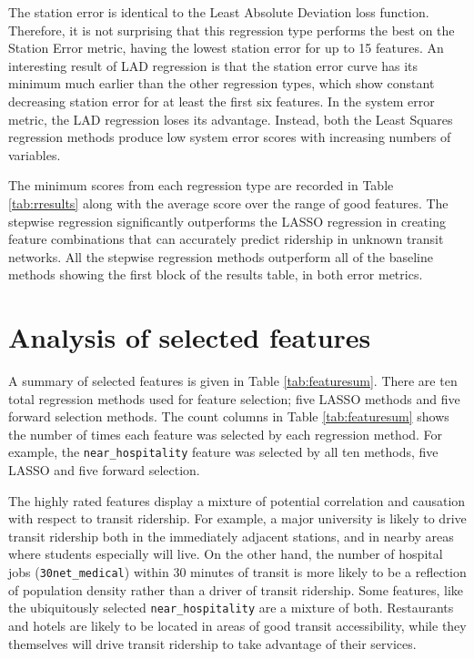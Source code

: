 \documentclass[11pt]{report}
\begin{document}
The station error is identical to the Least Absolute Deviation loss function. Therefore, it is not surprising that this regression type performs the best on the Station Error metric, having the lowest station error for up to 15 features. An interesting result of LAD regression is that the station error curve has its minimum much earlier than the other regression types, which show constant decreasing station error for at least the first six features. In the system error metric, the LAD regression loses its advantage. Instead, both the Least Squares regression methods produce low system error scores with increasing numbers of variables. 

The minimum scores from each regression type are recorded in Table \ref{tab:rresults} along with the average score over the range of good features. The stepwise regression significantly outperforms the LASSO regression in creating feature combinations that can accurately predict ridership in unknown transit networks. All the stepwise regression methods outperform all of the baseline methods showing the first block of the results table, in both error metrics. 

\section{Analysis of selected features}

A summary of selected features is given in Table \ref{tab:featuresum}. There are ten total regression methods used for feature selection; five LASSO methods and five forward selection methods. The count columns in Table \ref{tab:featuresum} shows the number of times each feature was selected by each regression method. For example, the \texttt{near\_hospitality} feature was selected by all ten methods, five LASSO and five forward selection.

The highly rated features display a mixture of potential correlation and causation with respect to transit ridership. For example, a major university is likely to drive transit ridership both in the immediately adjacent stations, and in nearby areas where students especially will live. On the other hand, the number of hospital jobs (\texttt{30net\_medical}) within 30 minutes of transit is more likely to be a reflection of population density rather than a driver of transit ridership. Some features, like the ubiquitously selected \texttt{near\_hospitality} are a mixture of both. Restaurants and hotels are likely to be located in areas of good transit accessibility, while they themselves will drive transit ridership to take advantage of their services. 
\end{document}
